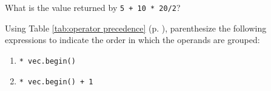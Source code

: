 %
%
\begin{question}
What is the value returned by \verb|5 + 10 * 20/2|?
\end{question}

\begin{question}
Using Table \ref{tab:operator precedence} (p. \pageref{tab:operator precedence}), parenthesize the following
expressions to indicate the order in which the operands are grouped:
\begin{enumerate}[label={(\alph*)}]
^^I\item \verb|* vec.begin()|
^^I\item \verb|* vec.begin() + 1|
\end{enumerate}
\end{question}
